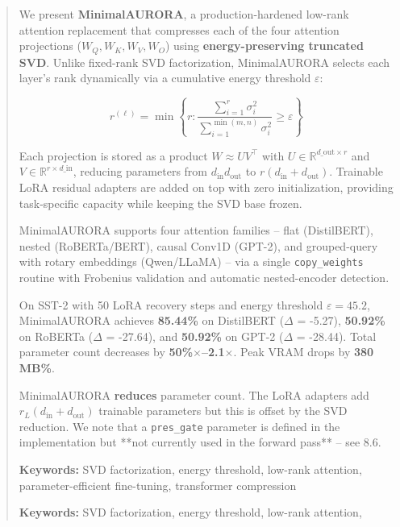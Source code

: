 \documentclass{article}
\begin{document}
\maketitle

\begin{abstract}
We present \textbf{MinimalAURORA}, a production-hardened low-rank attention 
replacement that compresses each of the four attention projections 
($W_Q, W_K, W_V, W_O$) using \textbf{energy-preserving truncated SVD}. Unlike 
fixed-rank SVD factorization, MinimalAURORA selects each layer's rank 
dynamically via a cumulative energy threshold $\varepsilon$:

\[
r^{(\ell)} = \min\left\{ r : \frac{\sum_{i=1}^r \sigma_i^2}{\sum_{i=1}^{\min(m, n)} \sigma_i^2} \geq \varepsilon \right\}
\tag{1}
\]

Each projection is stored as a product $W \approx U V^\top$ with $U \in 
\mathbb{R}^{d\_\text{out} \times r}$ and $V \in \mathbb{R}^{r \times d\_\text{in}}$, 
reducing parameters from $d_\text{in} d_\text{out}$ to $r(d_\text{in} + d_\text{out})$. 
Trainable LoRA residual adapters are added on top with zero initialization, 
providing task-specific capacity while keeping the SVD base frozen.

MinimalAURORA supports four attention families -- flat (DistilBERT), 
nested (RoBERTa/BERT), causal Conv1D (GPT-2), and grouped-query with 
rotary embeddings (Qwen/LLaMA) -- via a single \texttt{copy\_weights} routine 
with Frobenius validation and automatic nested-encoder detection.

On SST-2 with 50 LoRA recovery steps and energy threshold 
$\varepsilon = 45.2$, MinimalAURORA achieves \textbf{85.44\%} on 
DistilBERT ($\Delta$ = -5.27), \textbf{50.92\%} on RoBERTa ($\Delta$ = -27.64), 
and \textbf{50.92\%} on GPT-2 ($\Delta$ = -28.44). Total parameter count 
decreases by \textbf{50\%$\times$--2.1$\times$}. Peak VRAM drops by \textbf{380 MB\%}.

MinimalAURORA \textbf{reduces} parameter count. The LoRA adapters add 
$r_L(d_\text{in} + d_\text{out})$ trainable parameters but this is 
offset by the SVD reduction. We note that a \texttt{pres\_gate} parameter is 
defined in the implementation but **not currently used in the forward 
pass** -- see  8.6.

\textbf{Keywords:} SVD factorization, energy threshold, low-rank attention, 
parameter-efficient fine-tuning, transformer compression



\vspace{0.5em}
\noindent\textbf{Keywords:} SVD factorization, energy threshold, low-rank attention,
\end{abstract}
\end{document}
